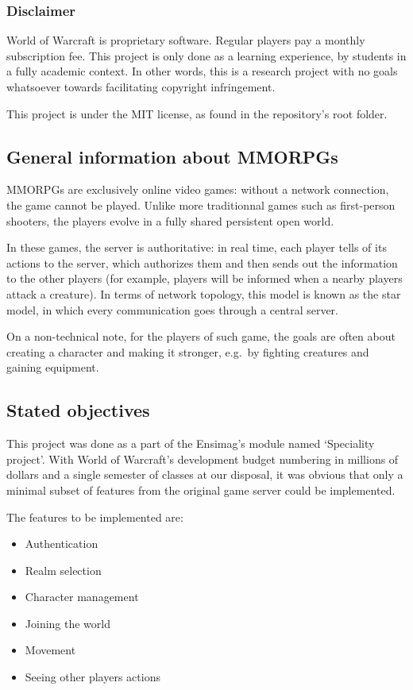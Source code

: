 \documentclass[paper=a4, fontsize=11pt]{scrartcl}
\begin{document}
\subsubsection{Disclaimer}

World of Warcraft is proprietary software.
Regular players pay a monthly subscription fee.
This project is only done as a learning experience, by students in a fully
academic context.
In other words, this is a research project with no goals whatsoever towards
facilitating copyright infringement.

This project is under the MIT license, as found in the repository's root folder.

\subsection{General information about MMORPGs}

MMORPGs are exclusively online video games: without a network connection, the
game cannot be played. Unlike more traditionnal games such as first-person
shooters, the players evolve in a fully shared persistent open world.

In these games, the server is authoritative: in real time, each player tells of
its actions to the server, which authorizes them and then sends out the
information to the other players (for example, players will be informed when a
nearby players attack a creature).
In terms of network topology, this model is known as the star model, in which
every communication goes through a central server.

On a non-technical note, for the players of such game, the goals are often about
creating a character and making it stronger, e.g.\ by fighting creatures and
gaining equipment.

\subsection{Stated objectives}

This project was done as a part of the Ensimag's module named `Speciality
project'.
With World of Warcraft's development budget numbering in millions of dollars and
a single semester of classes at our disposal, it was obvious that only a minimal
subset of features from the original game server could be implemented.\

The features to be implemented are:
\begin{itemize}
    \item Authentication
    \item Realm selection
    \item Character management
    \item Joining the world
    \item Movement
    \item Seeing other players actions
\end{itemize}
\end{document}

